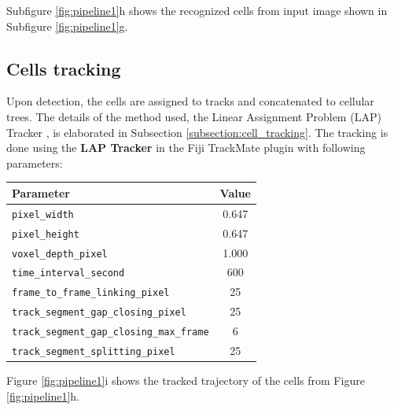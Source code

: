 \documentclass[pdftex,12pt,a4paper]{report}
\begin{document}
Subfigure \ref{fig:pipeline1}h shows the recognized cells from input image shown in Subfigure \ref{fig:pipeline1}g.

\subsection{Cells tracking}

Upon detection, the cells are assigned to tracks and concatenated to cellular trees. The details of the method used, the Linear Assignment Problem (LAP) Tracker \cite{jaqaman2008robust}, is elaborated in Subsection \ref{subsection:cell_tracking}. The tracking is done using the \textbf{LAP Tracker} in the Fiji TrackMate plugin \cite{tinevez2017trackmate} with following parameters:

\begin{table}[H]
\centering
\begin{tabular}[t]{ l | c }
Parameter & Value \\
\hline
\texttt{pixel\_width} & 0.647 \\
\texttt{pixel\_height} & 0.647 \\
\texttt{voxel\_depth\_pixel} & 1.000 \\
\texttt{time\_interval\_second} & 600\\
\texttt{frame\_to\_frame\_linking\_pixel} & 25 \\
\texttt{track\_segment\_gap\_closing\_pixel} & 25 \\
\texttt{track\_segment\_gap\_closing\_max\_frame} & 6 \\
\texttt{track\_segment\_splitting\_pixel} & 25 \\
\end{tabular}
\end{table}


Figure \ref{fig:pipeline1}i shows the tracked trajectory of the cells from Figure \ref{fig:pipeline1}h.

\end{document}
